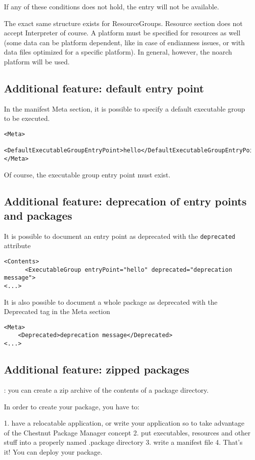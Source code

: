 If any of these conditions does not hold, the entry will not be available.

The exact same structure exists for ResourceGroups. Resource section does not accept Interpreter of course.
A platform must be specified for resources as well (some data can be platform
dependent, like in case of endianness issues, or with data files optimized for
a specific platform). In general, however, the noarch platform will be used.

\subsection{Additional feature: default entry point}

In the manifest Meta section, it is possible to specify a default executable group to be executed.

\begin{verbatim}
<Meta>
      <DefaultExecutableGroupEntryPoint>hello</DefaultExecutableGroupEntryPoint>
</Meta>
\end{verbatim}

Of course, the executable group entry point must exist.

\subsection{Additional feature: deprecation of entry points and packages}
It is possible to document an entry point as deprecated with the \verb+deprecated+ attribute
\begin{verbatim}
<Contents>
      <ExecutableGroup entryPoint="hello" deprecated="deprecation message">
<...>
\end{verbatim}

It is also possible to document a whole package as deprecated with the Deprecated tag in the Meta section
\begin{verbatim}
<Meta>
    <Deprecated>deprecation message</Deprecated>
<...>
\end{verbatim}

\subsection{Additional feature: zipped packages}

: you can create a zip archive of the contents of a package directory. 


In order to create your package, you have to:

   1. have a relocatable application, or write your application so to take advantage of the Chestnut Package Manager concept
   2. put executables, resources and other stuff into a properly named .package directory
   3. write a manifest file
   4. That’s it! You can deploy your package.

